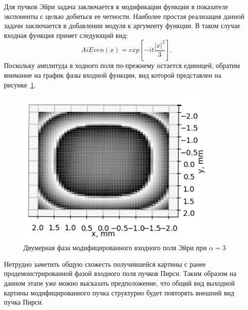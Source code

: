 {{    Для пучков Эйри задача заключается в модификации функции в показателе экспоненты с целью добиться ее четности.
    Наиболее простая реализация данной задачи заключается в добавлении модуля к аргументу функции.
    В таком случае входная функция примет следующий вид:
    \begin{equation*}
        AiEven(x) = exp[-it \frac{|x|^3}{3}].
    \end{equation*}
    Поскольку амплитуда в ходного поля по-прежнему остается единицей, обратим внимание на график фазы входной функции,
    вид которой представлен на рисунке~\ref{aieven_phase_2d}.
    \begin{figure}[H]
        \begin{center}
            \includegraphics[width=10cm]{plots/aievenphase_new}
            \caption{Двумерная фаза модифицированного входного поля Эйри при $\alpha  = 3$}
            \label{aieven_phase_2d}
        \end{center}
    \end{figure}

    Нетрудно заметить общую схожесть получившейся картины с ранее продемонстрированной фазой входного поля пучков Пирси.
    Таким образом на данном этапе уже можно высказать предположение,
    что общий вид выходной картины модифицированного пучка структурно будет повторять внешний вид пучка Пирси.

}}
